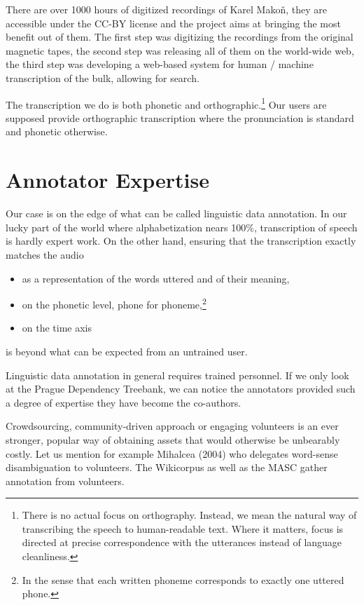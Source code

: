 \documentclass{itatnew}
\begin{document}
There are over 1000 hours of digitized recordings of Karel Makoň, they are
accessible under the CC-BY license and the project aims at bringing the most
benefit out of them. The first step was digitizing the recordings from the
original magnetic tapes, the second step was releasing all of them on the
world-wide web, the third step was developing a web-based system for human /
machine transcription of the bulk, allowing for search.

The transcription we do is both phonetic and orthographic.\footnote{There is no
actual focus on orthography. Instead, we mean the natural way of transcribing the
speech to human-readable text. Where it matters, focus is directed at precise
correspondence with the utterances instead of language cleanliness.} Our users
are supposed provide orthographic transcription where the pronunciation is
standard and phonetic otherwise.

\section{Annotator Expertise}

Our case is on the edge of what can be called linguistic data annotation. In our
lucky part of the world where alphabetization nears 100\%, transcription of
speech is hardly expert work. On the other hand, ensuring that the transcription
exactly matches the audio
\begin{itemize}
\item{as a representation of the words uttered and of their meaning,}
\item{on the phonetic level, phone for phoneme,\footnote{In the sense that each
written phoneme corresponds to exactly one uttered phone.}}
\item{on the time axis}
\end{itemize}
is beyond what can be expected from an untrained user.

Linguistic data annotation in general requires trained personnel. If we only
look at the Prague Dependency Treebank, we can notice the annotators provided
such a degree of expertise they have become the
co-authors\cite{hajivc2005complex}.

Crowdsourcing, community-driven approach or engaging volunteers is an ever
stronger, popular way of obtaining assets that would otherwise be unbearably
costly. Let us mention for example Mihalcea (2004)\cite{mihalcea2004building}
who delegates word-sense disambiguation to volunteers. The
Wikicorpus\cite{reese2010wikicorpus} as well as the MASC\cite{ide2010manually}
gather annotation from volunteers.
\end{document}
